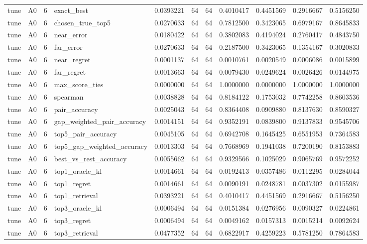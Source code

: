 \begin{tabular}{llrlrrrrrrr}
tune & A0 & 6 & exact_best & 0.0393221 & 64 & 64 & 0.4010417 & 0.4451569 & 0.2916667 & 0.5156250 \\
tune & A0 & 6 & chosen_true_top5 & 0.0270633 & 64 & 64 & 0.7812500 & 0.3423065 & 0.6979167 & 0.8645833 \\
tune & A0 & 6 & near_error & 0.0180422 & 64 & 64 & 0.3802083 & 0.4194024 & 0.2760417 & 0.4843750 \\
tune & A0 & 6 & far_error & 0.0270633 & 64 & 64 & 0.2187500 & 0.3423065 & 0.1354167 & 0.3020833 \\
tune & A0 & 6 & near_regret & 0.0001137 & 64 & 64 & 0.0010761 & 0.0020549 & 0.0006086 & 0.0015899 \\
tune & A0 & 6 & far_regret & 0.0013663 & 64 & 64 & 0.0079430 & 0.0249624 & 0.0026426 & 0.0144975 \\
tune & A0 & 6 & max_score_ties & 0.0000000 & 64 & 64 & 1.0000000 & 0.0000000 & 1.0000000 & 1.0000000 \\
tune & A0 & 6 & spearman & 0.0038828 & 64 & 64 & 0.8184122 & 0.1753032 & 0.7742258 & 0.8603536 \\
tune & A0 & 6 & pair_accuracy & 0.0025043 & 64 & 64 & 0.8364408 & 0.0909880 & 0.8137630 & 0.8590327 \\
tune & A0 & 6 & gap_weighted_pair_accuracy & 0.0014151 & 64 & 64 & 0.9352191 & 0.0839800 & 0.9137833 & 0.9545706 \\
tune & A0 & 6 & top5_pair_accuracy & 0.0045105 & 64 & 64 & 0.6942708 & 0.1645425 & 0.6551953 & 0.7364583 \\
tune & A0 & 6 & top5_gap_weighted_accuracy & 0.0013303 & 64 & 64 & 0.7668969 & 0.1941038 & 0.7200190 & 0.8153883 \\
tune & A0 & 6 & best_vs_rest_accuracy & 0.0055662 & 64 & 64 & 0.9329566 & 0.1025029 & 0.9065769 & 0.9572252 \\
tune & A0 & 6 & top1_oracle_kl & 0.0014661 & 64 & 64 & 0.0192413 & 0.0357486 & 0.0112295 & 0.0284044 \\
tune & A0 & 6 & top1_regret & 0.0014661 & 64 & 64 & 0.0090191 & 0.0248781 & 0.0037302 & 0.0155987 \\
tune & A0 & 6 & top1_retrieval & 0.0393221 & 64 & 64 & 0.4010417 & 0.4451569 & 0.2916667 & 0.5156250 \\
tune & A0 & 6 & top3_oracle_kl & 0.0006494 & 64 & 64 & 0.0151384 & 0.0276956 & 0.0090327 & 0.0224861 \\
tune & A0 & 6 & top3_regret & 0.0006494 & 64 & 64 & 0.0049162 & 0.0157313 & 0.0015214 & 0.0092624 \\
tune & A0 & 6 & top3_retrieval & 0.0477352 & 64 & 64 & 0.6822917 & 0.4259223 & 0.5781250 & 0.7864583 \\

\end{tabular}
